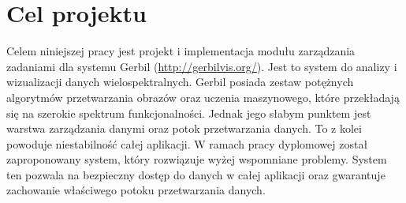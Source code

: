 
\chapter{Cel projektu}

Celem niniejszej pracy jest projekt i implementacja modułu zarządzania zadaniami dla systemu Gerbil (\url{http://gerbilvis.org/}). Jest to system do analizy i wizualizacji danych wielospektralnych. Gerbil posiada zestaw potężnych algorytmów przetwarzania obrazów oraz uczenia maszynowego, które przekładają się na szerokie spektrum funkcjonalności. Jednak jego słabym punktem jest warstwa zarządzania danymi oraz potok przetwarzania danych. To z kolei powoduje niestabilność całej aplikacji. W ramach pracy dyplomowej został zaproponowany system, który rozwiązuje wyżej wspomniane problemy. System ten pozwala na bezpieczny dostęp do danych w całej aplikacji oraz gwarantuje zachowanie właściwego potoku przetwarzania danych. 
